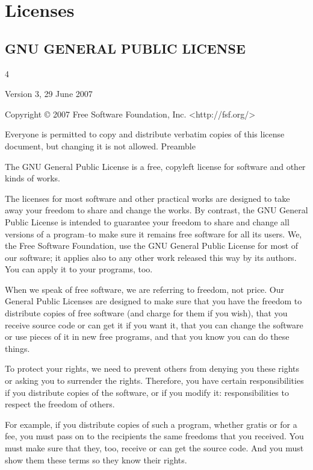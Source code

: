 \chapter{Licenses}
\label{Licenses}
{\tiny
\section {GNU GENERAL PUBLIC LICENSE}
\begin{multicols}{4}

Version 3, 29 June 2007

Copyright © 2007 Free Software Foundation, Inc. <http://fsf.org/>

Everyone is permitted to copy and distribute verbatim copies of this license document, but changing it is not allowed.
Preamble

The GNU General Public License is a free, copyleft license for software and other kinds of works.

The licenses for most software and other practical works are designed to take away your freedom to share and change the works. By contrast, the GNU General Public License is intended to guarantee your freedom to share and change all versions of a program--to make sure it remains free software for all its users. We, the Free Software Foundation, use the GNU General Public License for most of our software; it applies also to any other work released this way by its authors. You can apply it to your programs, too.

When we speak of free software, we are referring to freedom, not price. Our General Public Licenses are designed to make sure that you have the freedom to distribute copies of free software (and charge for them if you wish), that you receive source code or can get it if you want it, that you can change the software or use pieces of it in new free programs, and that you know you can do these things.

To protect your rights, we need to prevent others from denying you these rights or asking you to surrender the rights. Therefore, you have certain responsibilities if you distribute copies of the software, or if you modify it: responsibilities to respect the freedom of others.

For example, if you distribute copies of such a program, whether gratis or for a fee, you must pass on to the recipients the same freedoms that you received. You must make sure that they, too, receive or can get the source code. And you must show them these terms so they know their rights.


\end{multicols}}
